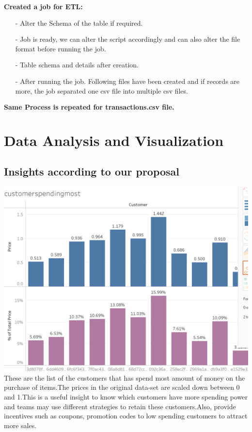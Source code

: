 \documentclass[11pt,journal,compsoc]{IEEEtran}
\begin{document}
\textbf{Created a job for ETL:}
\begin{itemize}
    \raggedright \item[-] Alter the Schema of the table if required.
    \item[-] Job is ready, we can alter the script accordingly and can also alter the file format before running the job.
    \item[-] Table schema and details after creation.
    \item[-] After running the job. Following files have been created and if records are more, the job separated one csv file into multiple csv files.
\end{itemize}
\textbf{Same Process is repeated for transactions.csv file.}
\section{Data Analysis and Visualization}
\subsection{Insights according to our proposal} 
\includegraphics[scale=0.35]{images/customer.png} 
\newline {}\\
\justifying These are the list of the customers that has spend most amount of money on the purchase of items.The prices in the original data-set are scaled down between 0 and 1.This is a useful insight to know which customers have more spending power and teams may use different strategies to retain these customers.Also, provide incentives such as coupons, promotion codes to low spending customers to attract more sales.\
\end{document}
